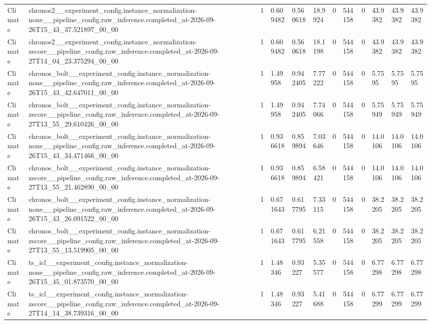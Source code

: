 \begin{tabular}{llllllllllll}
Climate & chronos2\_\_experiment\_config.instance\_normalization-none\_\_pipeline\_config.raw\_inference.completed\_at-2026-09-26T15\_43\_37.521897\_00\_00 & 1 & 0.609482 & 0.560618 & 18.9924 & 0 & 544158 & 0 & 43.9382 & 43.9382 & 43.9382 \\
Climate & chronos2\_\_experiment\_config.instance\_normalization-zscore\_\_pipeline\_config.raw\_inference.completed\_at-2026-09-27T14\_04\_23.375294\_00\_00 & 1 & 0.609482 & 0.560618 & 18.1198 & 0 & 544158 & 0 & 43.9382 & 43.9382 & 43.9382 \\
Climate & chronos\_bolt\_\_experiment\_config.instance\_normalization-none\_\_pipeline\_config.raw\_inference.completed\_at-2026-09-26T15\_43\_42.647011\_00\_00 & 1 & 1.49958 & 0.942405 & 7.77222 & 0 & 544158 & 0 & 5.7595 & 5.7595 & 5.7595 \\
Climate & chronos\_bolt\_\_experiment\_config.instance\_normalization-zscore\_\_pipeline\_config.raw\_inference.completed\_at-2026-09-27T13\_55\_29.610426\_00\_00 & 1 & 1.49958 & 0.942405 & 7.74066 & 0 & 544158 & 0 & 5.75949 & 5.75949 & 5.75949 \\
Climate & chronos\_bolt\_\_experiment\_config.instance\_normalization-none\_\_pipeline\_config.raw\_inference.completed\_at-2026-09-26T15\_43\_34.471466\_00\_00 & 1 & 0.936618 & 0.859894 & 7.03646 & 0 & 544158 & 0 & 14.0106 & 14.0106 & 14.0106 \\
Climate & chronos\_bolt\_\_experiment\_config.instance\_normalization-zscore\_\_pipeline\_config.raw\_inference.completed\_at-2026-09-27T13\_55\_21.462890\_00\_00 & 1 & 0.936618 & 0.859894 & 6.58421 & 0 & 544158 & 0 & 14.0106 & 14.0106 & 14.0106 \\
Climate & chronos\_bolt\_\_experiment\_config.instance\_normalization-none\_\_pipeline\_config.raw\_inference.completed\_at-2026-09-26T15\_43\_26.091522\_00\_00 & 1 & 0.671643 & 0.617795 & 7.33115 & 0 & 544158 & 0 & 38.2205 & 38.2205 & 38.2205 \\
Climate & chronos\_bolt\_\_experiment\_config.instance\_normalization-zscore\_\_pipeline\_config.raw\_inference.completed\_at-2026-09-27T13\_55\_13.519905\_00\_00 & 1 & 0.671643 & 0.617795 & 6.21558 & 0 & 544158 & 0 & 38.2205 & 38.2205 & 38.2205 \\
Climate & ts\_icl\_\_experiment\_config.instance\_normalization-none\_\_pipeline\_config.raw\_inference.completed\_at-2026-09-26T15\_45\_01.873570\_00\_00 & 1 & 1.48346 & 0.93227 & 5.35577 & 0 & 544158 & 0 & 6.77298 & 6.77298 & 6.77298 \\
Climate & ts\_icl\_\_experiment\_config.instance\_normalization-zscore\_\_pipeline\_config.raw\_inference.completed\_at-2026-09-27T14\_14\_38.739316\_00\_00 & 1 & 1.48346 & 0.93227 & 5.41688 & 0 & 544158 & 0 & 6.77299 & 6.77299 & 6.77299 \\

\end{tabular}
